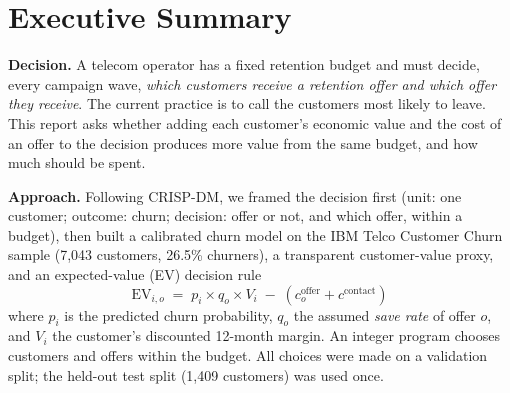 \documentclass[11pt,a4paper]{article}
\begin{document}
\section*{Executive Summary}

\textbf{Decision.} A telecom operator has a fixed retention budget and must decide, every campaign wave, \emph{which customers receive a retention offer and which offer they receive}. The current practice is to call the customers most likely to leave. This report asks whether adding each customer's economic value and the cost of an offer to the decision produces more value from the same budget, and how much should be spent.

\textbf{Approach.} Following CRISP-DM, we framed the decision first (unit: one customer; outcome: churn; decision: offer or not, and which offer, within a budget), then built a calibrated churn model on the IBM Telco Customer Churn sample (7,043 customers, 26.5\% churners), a transparent customer-value proxy, and an expected-value (EV) decision rule
\[ \text{EV}_{i,o} \;=\; p_i \times q_o \times V_i \;-\; (c^{\text{offer}}_o + c^{\text{contact}}) \]
where $p_i$ is the predicted churn probability, $q_o$ the assumed \emph{save rate} of offer $o$, and $V_i$ the customer's discounted 12-month margin. An integer program chooses customers and offers within the budget. All choices were made on a validation split; the held-out test split (1,409 customers) was used once.
\end{document}
